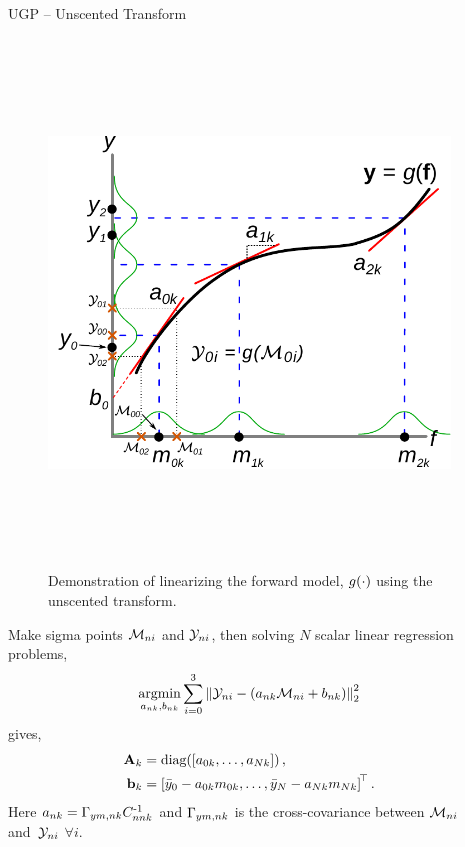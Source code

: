 \documentclass[final]{beamer}
\newlength{\sepwid}
\newlength{\onecolwid}
\begin{document}
\begin{frame}[t]
\begin{columns}[t]
\begin{column}{\sepwid}\end{column} %

\begin{column}{\onecolwid} %


\begin{block}{UGP -- Unscented Transform}

\begin{figure}
    \includegraphics[height=14cm]{fig/statlin_gp}
    \caption{Demonstration of linearizing the forward model, $\nonlin{\cdot}$
        using the unscented transform.}
\end{figure}        

Make sigma points \cite{Julier2004, Geist2010} $\Sfunc_{ni}$ and $\Sobs_{ni}$,
then solving $N$ scalar linear regression problems,
\begin{equation*}
    \argmin_{\Lins_{nk}, \intcpts_{nk}} \sum^{3}_{i=0} 
        \lnorm{2}{\Sobs_{ni} - \brac{\Lins_{nk}\Sfunc_{ni} + \intcpts_{nk}}}^2
\end{equation*}
gives,
\begin{align}
    \Linmat_k &= \diag{\sbrac{\Lins_{0k}, \ldots, \Lins_{Nk}}}, \\
    \intcpt_k &= \sbrac{\bar\obss_{0} - \Lins_{0k}\pomeans_{0k}, \ldots,
        \bar\obss_{N} - \Lins_{Nk}\pomeans_{Nk}}\transpose. \nonumber
\end{align}
Here $\Lins_{nk} = \xcovs_{\obss\pomeans,nk} \pocovs_{nnk}\inv$ and 
$\xcovs_{\obss\pomeans,nk}$ is the cross-covariance between $\Sfunc_{ni}$ 
and~$\Sobs_{ni}$ $\forall i$.


\end{block}
\end{column}
\end{columns}
\end{frame}
\end{document}
